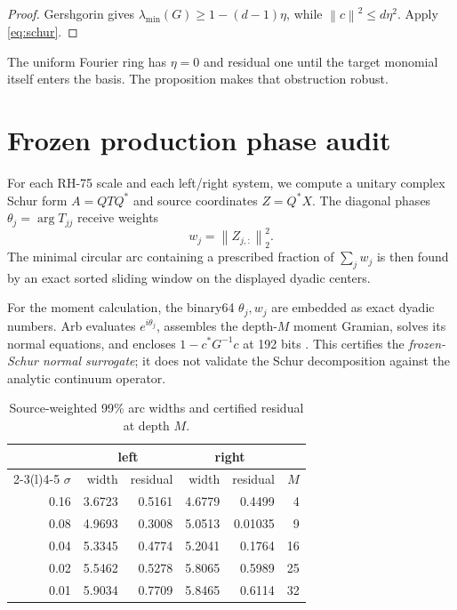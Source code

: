 \documentclass[11pt]{article}
\newcommand{\norm}[1]{\left\lVert#1\right\rVert}
\begin{document}
\begin{proof}
Gershgorin gives $\lambda_{\min}(G)\ge1-(d-1)\eta$, while
$\norm c^2\le d\eta^2$.  Apply \eqref{eq:schur}.
\end{proof}

The uniform Fourier ring has $\eta=0$ and residual one until the target
monomial itself enters the basis.  The proposition makes that obstruction
robust.

\section{Frozen production phase audit}

For each RH-75 scale and each left/right system, we compute a unitary complex
Schur form $A=QTQ^*$ and source coordinates $Z=Q^*X$.  The diagonal phases
$\theta_j=\arg T_{jj}$ receive weights
\[
 w_j=\norm{Z_{j,:}}_2^2.
\]
The minimal circular arc containing a prescribed fraction of $\sum_jw_j$ is
then found by an exact sorted sliding window on the displayed dyadic centers.

For the moment calculation, the binary64 $\theta_j,w_j$ are embedded as exact
dyadic numbers.  Arb evaluates $e^{i\theta_j}$, assembles the depth-$M$ moment
Gramian, solves its normal equations, and encloses
$1-c^*G^{-1}c$ at 192 bits \citep{Johansson2017}.  This certifies the
\emph{frozen-Schur normal surrogate}; it does not validate the Schur
decomposition against the analytic continuum operator.

\begin{table}[H]
\centering
\small
\caption{Source-weighted 99\% arc widths and certified residual at depth $M$.}
\label{tab:audit}
\begin{tabular}{@{}rrrrrr@{}}
\toprule
&\multicolumn{2}{c}{left}&\multicolumn{2}{c}{right}\\
\cmidrule(lr){2-3}\cmidrule(l){4-5}
$\sigma$ & width & residual & width & residual & $M$\\
\midrule
0.16 & 3.6723 & 0.5161 & 4.6779 & 0.4499 & 4\\
0.08 & 4.9693 & 0.3008 & 5.0513 & 0.01035 & 9\\
0.04 & 5.3345 & 0.4774 & 5.2041 & 0.1764 & 16\\
0.02 & 5.5462 & 0.5278 & 5.8065 & 0.5989 & 25\\
0.01 & 5.9034 & 0.7709 & 5.8465 & 0.6114 & 32\\
\bottomrule
\end{tabular}
\end{table}
\end{document}
